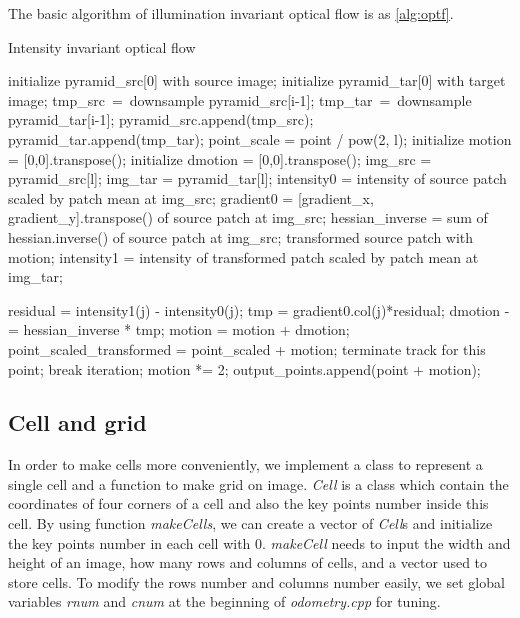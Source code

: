 \documentclass{easychair}
\begin{document}
The basic algorithm of illumination invariant optical flow is as \ref{alg:optf}.
\begin{algorithm}[h]  
  
  \caption{Intensity invariant optical flow}  
  \label{alg:optf}
  \begin{algorithmic}[1]
  	\State initialize pyramid\_src[0] with source image;
  	\State initialize pyramid\_tar[0] with target image;
      \State tmp\_src\ =\ downsample pyramid\_src[i-1];
      \State tmp\_tar\ =\ downsample pyramid\_tar[i-1];
      \State pyramid\_src.append(tmp\_src);
      \State pyramid\_tar.append(tmp\_tar);
    \EndFor
      \State point\_scale = point / pow(2, l);
      \State initialize motion = [0,0].transpose();
      \State initialize dmotion = [0,0].transpose();
      	\State img\_src = pyramid\_src[l];
      	\State img\_tar = pyramid\_tar[l];
      	\State intensity0 = intensity of source patch scaled by patch mean at img\_src;
      	\State gradient0 = [gradient\_x, gradient\_y].transpose() of source patch at img\_src;
      	\State hessian\_inverse = sum of hessian.inverse() of source patch at img\_src;
		  \State transformed source patch with motion;
      	  \State intensity1 = intensity of transformed patch scaled by patch mean at img\_tar;
      	  
      	  	\State residual = intensity1(j) - intensity0(j);
      	  	\State tmp = gradient0.col(j)*residual;
      	  	\State dmotion -= hessian\_inverse * tmp;
      	  \EndFor
      	  \State motion = motion + dmotion;
      	  \State point\_scaled\_transformed = point\_scaled + motion;
      	  	\State terminate track for this point;
      	  \EndIf
      	  	\State break iteration;
      	  \EndIf
      	\EndFor
		\State motion *= 2;      
      \EndFor 
      \State output\_points.append(point + motion);
    \EndFor 
  \end{algorithmic}  
  
\end{algorithm}  


\subsection{Cell and grid}
In order to make cells more conveniently, we implement a class to represent a single cell and a function to make grid on image. \emph{Cell} is a class which contain the coordinates of four corners of a cell and also the key points number inside this cell. By using function \emph{makeCells}, we can create a vector of \emph{Cell}s and initialize the key points number in each cell with 0. \emph{makeCell} needs to input the width and height of an image, how many rows and columns of cells, and a vector used to store cells. To modify the rows number and columns number easily, we set global variables \emph{rnum} and \emph{cnum} at the beginning of \emph{odometry.cpp} for tuning.\\
\end{document}
